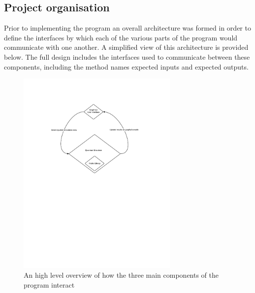 \documentclass[bibliography=totocnumbered, 10pt]{article}
\theoremstyle{NoticeStyle}
\begin{document}
\subsection{Project organisation}
Prior to implementing the program an overall architecture was formed in order to define the interfaces by which each of the various parts of the program would communicate with one another. A simplified view of this architecture is provided below. The full design includes the interfaces used to communicate between these components, including the method names expected inputs and expected outputs.
\begin{figure}[H]
\centering
\includegraphics[width=0.7\textwidth]{img/QCPOverallArch.pdf}
\caption{An high level overview of how the three main components of the program interact}
\end{figure}
\end{document}
